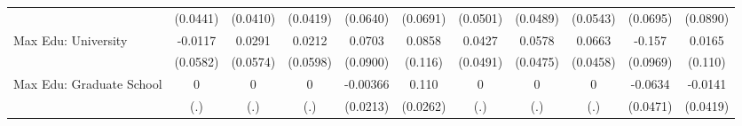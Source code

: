 {\begin{tabular}{l*{10}{c}}
            &    (0.0441)         &    (0.0410)         &    (0.0419)         &    (0.0640)         &    (0.0691)         &    (0.0501)         &    (0.0489)         &    (0.0543)         &    (0.0695)         &    (0.0890)         \\
\addlinespace
Max Edu: University&     -0.0117         &      0.0291         &      0.0212         &      0.0703         &      0.0858         &      0.0427         &      0.0578         &      0.0663         &      -0.157         &      0.0165         \\
            &    (0.0582)         &    (0.0574)         &    (0.0598)         &    (0.0900)         &     (0.116)         &    (0.0491)         &    (0.0475)         &    (0.0458)         &    (0.0969)         &     (0.110)         \\
\addlinespace
Max Edu: Graduate School&           0         &           0         &           0         &    -0.00366         &       0.110\sym{***}&           0         &           0         &           0         &     -0.0634         &     -0.0141         \\
            &         (.)         &         (.)         &         (.)         &    (0.0213)         &    (0.0262)         &         (.)         &         (.)         &         (.)         &    (0.0471)         &    (0.0419)         \\
\bottomrule
\end{tabular}
}
